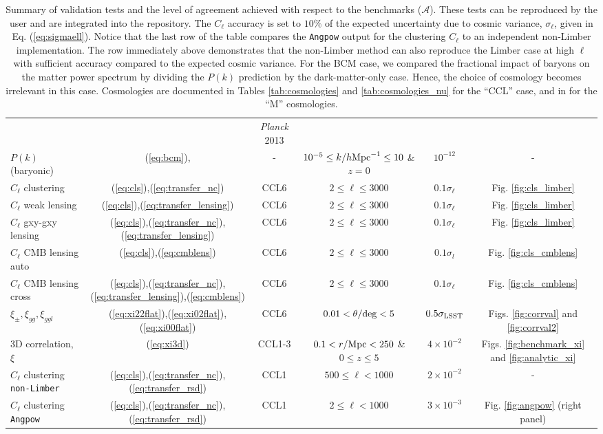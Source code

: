 \begin{sidewaystable*}[!htp]
\begin{tabular}{ l|c c c c c}
     &  & {\it Planck} 2013 &  & \\
    $P(k)$ (baryonic) & (\ref{eq:bcm}), \citet{Schneider15} &  - & $10^{-5}\leq k/h{\rm Mpc}^{-1}\leq 10$ \& $z=0$ & $10^{-12}$ & -\\
    $C_\ell$ clustering & (\ref{eq:cls}),(\ref{eq:transfer_nc})& CCL6 &$2 \leq \ell\leq 3000$ &  $0.1\sigma_\ell$  & Fig. \ref{fig:cls_limber}\\
    $C_\ell$ weak lensing & (\ref{eq:cls}),(\ref{eq:transfer_lensing})& CCL6 &$2 \leq \ell\leq 3000$ &  $0.1\sigma_\ell$  & Fig. \ref{fig:cls_limber}\\
    $C_\ell$ gxy-gxy lensing & (\ref{eq:cls}),(\ref{eq:transfer_nc}),(\ref{eq:transfer_lensing})& CCL6 &$2 \leq \ell\leq 3000$ &  $0.1\sigma_\ell$ & Fig. \ref{fig:cls_limber}\\
    $C_\ell$ CMB lensing auto &(\ref{eq:cls}),(\ref{eq:cmblens}) & CCL6 & $2 \leq \ell\leq 3000$& $0.1\sigma_l$  & Fig. \ref{fig:cls_cmblens}\\
    $C_\ell$ CMB lensing cross &(\ref{eq:cls}),(\ref{eq:transfer_nc}),(\ref{eq:transfer_lensing}),(\ref{eq:cmblens}) & CCL6 & $2 \leq \ell\leq 3000$& $0.1\sigma_\ell$  & Fig. \ref{fig:cls_cmblens}\\
    $\xi_{\pm},\xi_{gg},\xi_{ggl}$ & (\ref{eq:xi22flat}),(\ref{eq:xi02flat}),(\ref{eq:xi00flat}) & CCL6 & $0.01< \theta/{\rm deg}< 5$&  $0.5\sigma_{\rm LSST}$ & Figs. \ref{fig:corrval} and \ref{fig:corrval2}\\
    3D correlation, $\xi$ & (\ref{eq:xi3d}) & CCL1-3 & $0.1<r/{\rm Mpc}<250$ \& $0 \leq z \leq 5$& $4\times 10^{-2}$ & Figs. \ref{fig:benchmark_xi} and \ref{fig:analytic_xi} \\
    $C_\ell$ clustering {\tt non-Limber} &  (\ref{eq:cls}),(\ref{eq:transfer_nc}),(\ref{eq:transfer_rsd}) & CCL1 & $500 \leq \ell < 1000$ & $2\times 10^{-2}$ & - \\
    $C_\ell$ clustering {\tt Angpow} & (\ref{eq:cls}),(\ref{eq:transfer_nc}),(\ref{eq:transfer_rsd}) & CCL1 & $2 \leq \ell < 1000$ & $3\times 10^{-3}$  & Fig. \ref{fig:angpow} (right panel)\\
    \hline
  \end{tabular}
  \caption{Summary of \ccl validation tests and the level of agreement achieved with respect to the benchmarks ($\mathcal{A}$). These tests can be reproduced by the user and are integrated into the \ccl repository. The $C_\ell$ accuracy is set to $10\%$ of the expected uncertainty due to cosmic variance, $\sigma_\ell$, given in Eq. (\ref{eq:sigmaell}). Notice that the last row of the table compares the {\tt Angpow} output for the clustering $C_\ell$ to an independent non-Limber implementation. The row immediately above demonstrates that the non-Limber method can also reproduce the Limber case at high $\ell$ with sufficient accuracy compared to the expected cosmic variance. For the BCM case, we compared the fractional impact of baryons on the matter power spectrum by dividing the $P(k)$ prediction by the dark-matter-only case. Hence, the choice of cosmology becomes irrelevant in this case. Cosmologies are documented in Tables \ref{tab:cosmologies} and \ref{tab:cosmologies_nu} for the ``CCL'' case, and in \citet{Lawrence17} for the ``M'' cosmologies.}
  \label{tab:tests}
\end{sidewaystable*}
